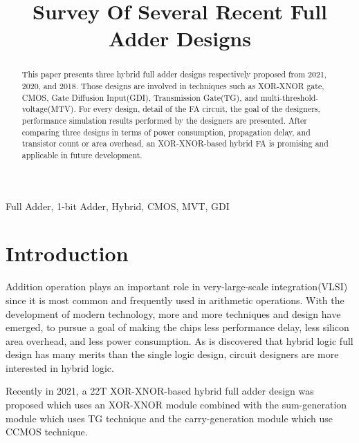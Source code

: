 \documentclass[conference]{IEEEtran}
\begin{document}
\title{Survey Of Several Recent Full Adder Designs}

\author{
}
\maketitle

\begin{abstract}
	This paper presents three hybrid full adder designs respectively proposed from 2021, 2020, and 2018.
	Those designs are involved in techniques such as XOR-XNOR gate, CMOS, Gate Diffusion Input(GDI), Transmission Gate(TG), and multi-threshold-voltage(MTV).
	For every design, detail of the FA circuit, the goal of the designers, performance simulation results performed by the designers are presented.
	After comparing three designs in terms of power consumption, propagation delay, and transistor count or area overhead,
	an XOR-XNOR-based hybrid FA is promising and applicable in future development.
\end{abstract}

\begin{IEEEkeywords}
	Full Adder, 1-bit Adder, Hybrid, CMOS, MVT, GDI
\end{IEEEkeywords}

\section{Introduction}


Addition operation plays an important role in very-large-scale integration(VLSI) since it is most common and frequently used in arithmetic operations.
With the development of modern technology, more and more techniques and design have emerged,
to pursue a goal of making the chips less performance delay, less silicon area overhead, and less power consumption.
As is discovered that hybrid logic full design has many merits than the single logic design, circuit designers are more interested in hybrid logic.

Recently in 2021, a 22T XOR-XNOR-based hybrid full adder design \cite{20212210429416} was proposed
which uses an XOR-XNOR module combined with the sum-generation module which uses TG technique
and the carry-generation module which use CCMOS technique.
\end{document}
